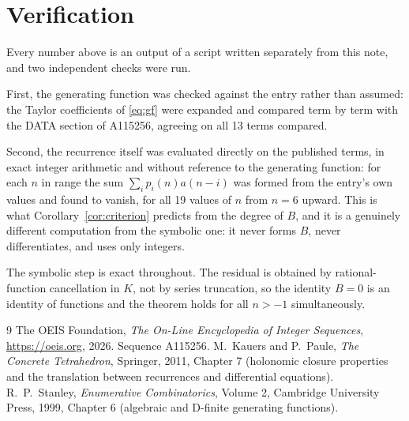 \documentclass[11pt,a4paper]{article}
\theoremstyle{plain}
\theoremstyle{definition}
\begin{document}
\section{Verification}

Every number above is an output of a script written separately from this note, and two
independent checks were run.

First, the generating function was checked against the entry rather than assumed: the
Taylor coefficients of \eqref{eq:gf} were expanded and compared term by term with the DATA
section of A115256, agreeing on all 13 terms compared.

Second, the recurrence itself was evaluated directly on the published terms, in exact
integer arithmetic and without reference to the generating function: for each $n$ in range
the sum $\sum_{i}p_{i}(n)a(n-i)$ was formed from the entry's own values and found to
vanish, for all 19 values of $n$ from $n=6$ upward. This is what
Corollary~\ref{cor:criterion} predicts from the degree of $B$, and it is a genuinely
different computation from the symbolic one: it never forms $B$, never differentiates, and
uses only integers.

The symbolic step is exact throughout. The residual is obtained by rational-function
cancellation in $K$, not by series truncation, so the identity $B=0$ is an
identity of functions and the theorem holds for all $n>-1$ simultaneously.

\begin{thebibliography}{9}
 The OEIS Foundation, \emph{The On-Line Encyclopedia of Integer Sequences},
\url{https://oeis.org}, 2026. Sequence A115256.
 M.~Kauers and P.~Paule, \emph{The Concrete Tetrahedron}, Springer, 2011,
Chapter 7 (holonomic closure properties and the translation between recurrences and
differential equations).
 R.~P.~Stanley, \emph{Enumerative Combinatorics}, Volume 2, Cambridge
University Press, 1999, Chapter 6 (algebraic and D-finite generating functions).
\end{thebibliography}
\end{document}
